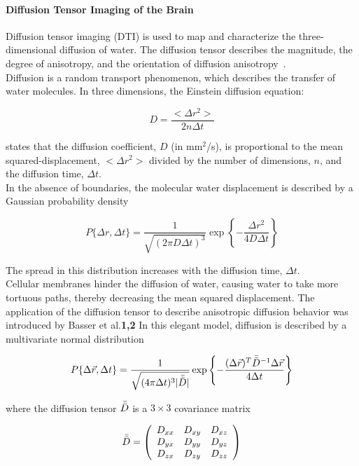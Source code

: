 \paragraph{Diffusion Tensor Imaging of the Brain~\cite{citeulike:1695483}}{
Diffusion tensor imaging (DTI) is used to map and characterize the three-dimensional diffusion of water. The diffusion tensor describes the magnitude, the degree of anisotropy, and the orientation of diffusion anisotropy~\cite{citeulike:1695483}.\\
Diffusion is a random transport phenomenon, which describes the transfer of water molecules. In three dimensions, the Einstein diffusion equation:

$$
D = \frac{<\Delta r^{2}>}{2n \Delta t}
$$

states that the diffusion coefficient, $D$ (in mm$^{2}$/s), is proportional to the mean squared-displacement, $<\Delta r^{2}>$ divided by the number of dimensions, $n$, and the diffusion time, $\Delta t$.\\
In the absence of boundaries, the molecular water displacement is described by a Gaussian probability density

$$
P \{\Delta r, \Delta t\} = \frac{1}{\sqrt{(2 \pi D \Delta t)^{3}}} \exp \left \lbrace - \frac{\Delta r^{2}}{4 D \Delta t} \right \rbrace
$$

The spread in this distribution increases with the diffusion time, $\Delta t$.\\

Cellular membranes hinder the diffusion of water, causing water to take more tortuous paths, thereby decreasing the mean squared displacement. The application of the diffusion tensor to describe anisotropic diffusion behavior was introduced by Basser et al.{\bf 1,2} In this elegant model, diffusion is described by a multivariate normal distribution


$$
P \{\Delta \vec{r}, \Delta t\} = \frac{1}{\sqrt{(4 \pi \Delta t)^{3} |\Bar{\bar{D}}|}} \exp \left \lbrace - \frac{(\Delta \vec{r})^{T} \Bar{\bar{D}}^{-1} \Delta \vec{r}}{4 \Delta t} \right \rbrace
$$

where the diffusion tensor $\Bar{\bar{D}}$ is a $3 \times 3$ covariance matrix

$$
\Bar{\bar{D}} = 
\left(
\begin{array}{ccc}
D_{xx} & D_{xy} & D_{xz} \\
D_{yx} & D_{yy} & D_{yz} \\
D_{zx} & D_{zy} & D_{zz} \\
\end{array}
\right)
$$

}
